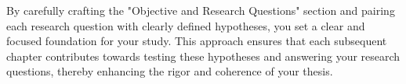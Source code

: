 By carefully crafting the "Objective and Research Questions" section and pairing each research question with clearly defined hypotheses, you set a clear and focused foundation for your study. This approach ensures that each subsequent chapter contributes towards testing these hypotheses and answering your research questions, thereby enhancing the rigor and coherence of your thesis.
